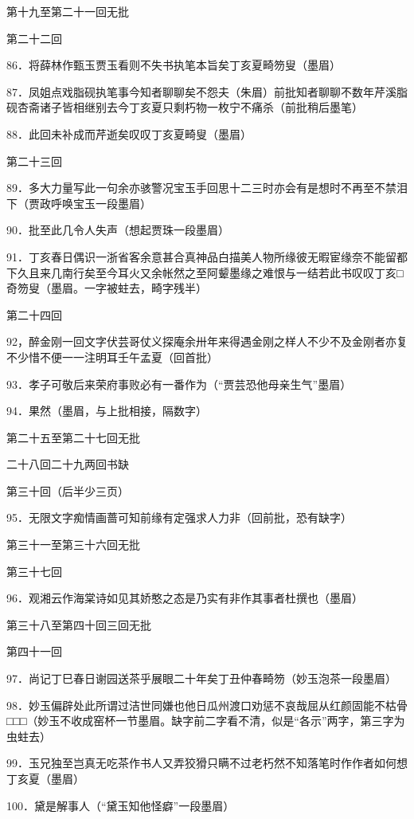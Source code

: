 第十九至第二十一回无批

第二十二回

86．将薛林作甄玉贾玉看则不失书执笔本旨矣丁亥夏畸笏叟{（\kaishu 墨眉）}

87．凤姐点戏脂砚执笔事今知者聊聊矣不怨夫（朱眉）前批知者聊聊不数年芹溪脂砚杏斋诸子皆相继别去今丁亥夏只剩朽物一枚宁不痛杀{（\kaishu 前批稍后墨笔）}

88．此回未补成而芹逝矣叹叹丁亥夏畸叟{（\kaishu 墨眉）}

第二十三回

89．多大力量写此一句余亦骇警况宝玉手回思十二三时亦会有是想时不再至不禁泪下{（\kaishu 贾政呼唤宝玉一段墨眉）}

90．批至此几令人失声{（\kaishu 想起贾珠一段墨眉）}

91．丁亥春日偶识一浙省客余意甚合真神品白描美人物所缘彼无暇宦缘奈不能留都下久且来几南行矣至今耳火又余帐然之至阿颦墨缘之难恨与一结若此书叹叹丁亥□奇笏叟{（\kaishu 墨眉。一字被蛀去，畸字残半）}

第二十四回

92，醉金刚一回文字伏芸哥仗义探庵余卅年来得遇金刚之样人不少不及金刚者亦复不少惜不便一一注明耳壬午孟夏{（\kaishu 回首批）}

93．孝子可敬后来荣府事败必有一番作为{（\kaishu ``贾芸恐他母亲生气''墨眉）}

94．果然{（\kaishu 墨眉，与上批相接，隔数字）}

第二十五至第二十七回无批

二十八回二十九两回书缺

第三十回（后半少三页）

95．无限文字痴情画蔷可知前缘有定强求人力非{（\kaishu 回前批，恐有缺字）}

第三十一至第三十六回无批

第三十七回

96．观湘云作海棠诗如见其娇憨之态是乃实有非作其事者杜撰也{（\kaishu 墨眉）}

第三十八至第四十回三回无批

第四十一回

97．尚记丁巳春日谢园送茶乎展眼二十年矣丁丑仲春畸笏{（\kaishu 妙玉泡茶一段墨眉）}

98．妙玉偏辟处此所谓过洁世同嫌也他日瓜州渡口劝惩不哀哉屈从红颜固能不枯骨□□□{（\kaishu 妙玉不收成窑杯一节墨眉。缺字前二字看不清，似是``各示''两字，第三字为虫蛀去）}

99．玉兄独至岂真无吃茶作书人又弄狡猾只瞒不过老朽然不知落笔时作作者如何想丁亥夏{（\kaishu 墨眉）}

100．黛是解事人{（\kaishu ``黛玉知他怪癖''一段墨眉）}

